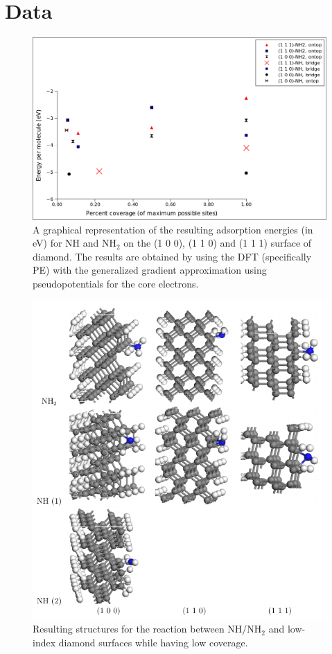 \documentclass[12pt,a4paper]{article}
\begin{document}
\appendix 
\section{Data}



\begin{figure}[!h] \captionsetup{width=.8\linewidth} \caption{A graphical representation of the resulting adsorption energies (in eV) for NH and NH$_2$ on the (1 0 0), (1 1 0) and (1 1 1) surface of diamond. The results are obtained by using the DFT (specifically PE) with the generalized gradient approximation using pseudopotentials for the core electrons.} \label{NH2diagram}
\includegraphics[width=.8\linewidth]{pictures/NH2diagram.png}
\end{figure}


\begin{figure} \captionsetup{width=.8\linewidth} \caption{Resulting structures for the reaction between NH/NH$_2$ and low-index diamond surfaces while having low coverage.} \label{lowcoverage}
\includegraphics[width=.8\linewidth]{pictures/singleSite_result.png}
\end{figure}
\end{document}
